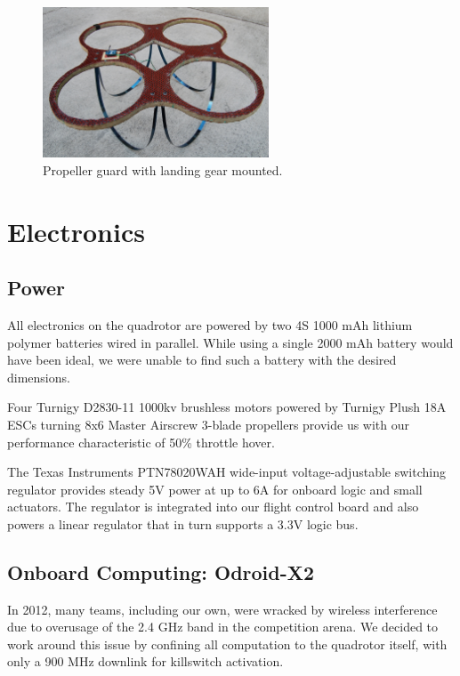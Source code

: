 \documentclass[12pt,letterpaper]{article} \usepackage[margin=1in]{geometry}
\begin{document}
\begin{figure}[!h]
	\centering
	\includegraphics[width=0.6\textwidth]{img/prop_guard.jpg}
	\caption{Propeller guard with landing gear mounted.}
	\label{fig:feastress}
\end{figure}


\section*{Electronics}

\subsection*{Power}

All electronics on the quadrotor are powered by two 4S 1000 mAh lithium polymer
batteries wired in parallel. While using a single 2000 mAh battery would have
been ideal, we were unable to find such a battery with the desired dimensions.

Four Turnigy D2830-11 1000kv brushless motors powered by Turnigy Plush 18A ESCs
turning 8x6 Master Airscrew 3-blade propellers provide us with our performance
characteristic of 50\% throttle hover.

The Texas Instruments PTN78020WAH wide-input voltage-adjustable switching
regulator provides steady 5V power at up to 6A for onboard logic and small
actuators. The regulator is integrated into our flight control board and also
powers a linear regulator that in turn supports a 3.3V logic bus.


\subsection*{Onboard Computing: Odroid-X2}

In 2012, many teams, including our own, were wracked by wireless interference
due to overusage of the 2.4 GHz band in the competition arena. We decided to
work around this issue by confining all computation to the quadrotor itself,
with only a 900 MHz downlink for killswitch activation.
\end{document}
